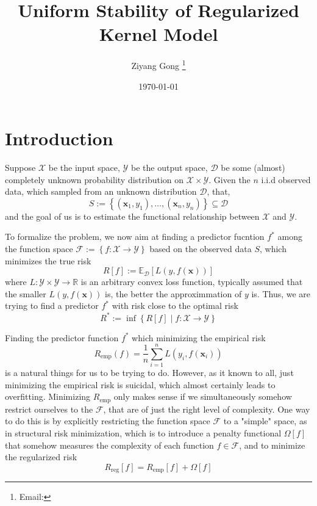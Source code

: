 \documentclass[a4paper, 12pt, mtpro2, authoryear]{elegantpaper}
\title{Uniform Stability of Regularized Kernel Model}
\author{Ziyang Gong \thanks{Email: \email{meetziyang@outlook.com}}}
\date{\today}
\begin{document}
\maketitle

\section{Introduction}

Suppose $\mathcal{X}$ be the input space, $\mathcal{Y}$ be the output space, $\mathcal{D}$ be some (almost) completely unknown probability distribution on $\mathcal{X}\times\mathcal{Y}$. Given the $n$ i.i.d observed data, which sampled from an unknown distribution $\mathcal{D}$, that,
\begin{equation}
    S:=\left\{(\mathbf{x}_{1},y_{1}),\ldots,(\mathbf{x}_{n},y_{n})\right\}\subseteq\mathcal{D}
\end{equation}
and the goal of us is to estimate the functional relationship between $\mathcal{X}$ and $\mathcal{Y}$.

To formalize the problem, we now aim at finding a predictor fucntion $f^{*}$ among the function space $\mathcal{F}:=\left\{f:\mathcal{X}\rightarrow\mathcal{Y}\right\}$ based on the observed data $S$, which minimizes the true risk
\begin{equation} \label{eq:true-risk}
    R[f]:=\mathbb{E}_{\mathcal{D}}\left[L\left(y,f(\mathbf{x})\right)\right]
\end{equation}
where $L:\mathcal{Y}\times\mathcal{Y}\rightarrow\mathbb{R}$ is an arbitrary convex loss function, typically assumed that the smaller $L\left(y,f(\mathbf{x})\right)$ is, the better the approximmation of $y$ is. Thus, we are trying to find a predictor $f^{*}$ with risk close to the optimal risk
\begin{equation}
    R^{*}:=\inf\left\{R[f]\mid f:\mathcal{X}\rightarrow\mathcal{Y}\right\}
\end{equation}

Finding the predictor function $f^{*}$ which minimizing the empirical risk
\begin{equation}
    R_{\text{emp}}(f)=\frac{1}{n}\sum_{i=1}^{n}L\left(y_{i},f(\textbf{x}_{i})\right)
\end{equation}
is a natural things for us to be trying to do. However, as it known to all, just minimizing the empirical risk is suicidal, which almost certainly leads to overfitting. Minimizing $R_{\text{emp}}$ only makes sense if we simultaneously somehow restrict ourselves to the $\mathcal{F}$, that are of just the right level of complexity. One way to do this is by explicitly restricting the function space $\mathcal{F}$ to a "simple" space, as in structural risk minimization, which is to introduce a penalty functional $\Omega[f]$ that somehow measures the complexity of each function $f\in\mathcal{F}$, and to minimize the regularized risk
\begin{equation}
    R_{\text{reg}}[f]=R_{\text{emp}}[f]+\Omega[f]
\end{equation}
\end{document}
